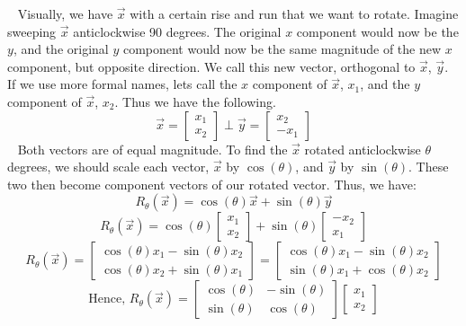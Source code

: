 \documentclass[11pt]{article}
\begin{document}
$\,\,\,$ Visually, we have $\vec{x}$ with a certain rise and run that we want to rotate. Imagine sweeping $\vec{x}$ anticlockwise 90 degrees. The original $x$ component would now be the $y$, and the original $y$ component would now be the same magnitude of the new $x$ component, but opposite direction. We call this new vector, orthogonal to $\vec{x}$, $\vec{y}$. If we use more formal names, lets call the $x$ component of $\vec{x}$, $x_1$, and the $y$ component of $\vec{x}$, $x_2$. Thus we have the following.
$$\vec{x}=\begin{bmatrix}x_1\\x_2\end{bmatrix}\perp\vec{y}=\begin{bmatrix}x_2\\-x_1\end{bmatrix}$$
$\,\,\,$ Both vectors are of equal magnitude. To find the $\vec{x}$ rotated anticlockwise $\theta$ degrees, we should scale each vector, $\vec{x}$ by $\cos(\theta)$, and $\vec{y}$ by $\sin(\theta)$. These two then become component vectors of our rotated vector. Thus, we have:
$$R_\theta (\vec{x})=\cos(\theta)\vec{x}+\sin(\theta)\vec{y}$$
$$R_\theta (\vec{x})=\cos(\theta)\begin{bmatrix}x_1\\x_2\end{bmatrix}+\sin(\theta)\begin{bmatrix}-x_2\\x_1\end{bmatrix}$$
$$R_\theta (\vec{x})=\begin{bmatrix}\cos(\theta)x_1-\sin(\theta)x_2\\\cos(\theta)x_2+\sin(\theta)x_1\end{bmatrix}=\begin{bmatrix}\cos(\theta)x_1-\sin(\theta)x_2\\\sin(\theta)x_1+\cos(\theta)x_2\end{bmatrix}$$
$$\text{Hence, } R_\theta (\vec{x})=\begin{bmatrix}\cos(\theta) & -\sin(\theta)\\\sin(\theta) & \cos(\theta)\end{bmatrix}\begin{bmatrix}x_1\\x_2\end{bmatrix}$$
\end{document}
